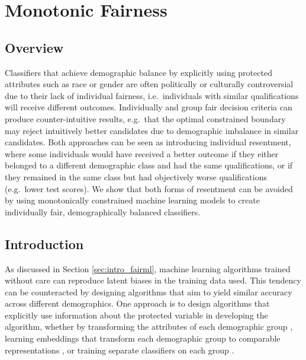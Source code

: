 \chapter{Monotonic Fairness}
\label{ch:MonoFair}

\section{Overview}

    Classifiers that achieve demographic balance by explicitly using protected attributes such as race or gender are often politically or culturally controversial due to their lack of individual fairness, i.e.\ individuals with similar qualifications will receive different outcomes. Individually and group fair decision criteria can produce counter-intuitive results, e.g.\ that the optimal constrained boundary may reject intuitively better candidates due to demographic imbalance in similar candidates. Both approaches can be seen as introducing individual resentment, where some individuals would have received a better outcome if they either belonged to a different demographic class and had the same qualifications, or if they remained in the same class but had objectively worse qualifications (e.g.\ lower test scores). We show that both forms of resentment can be avoided by using monotonically constrained machine learning models to create individually fair, demographically balanced classifiers.

\section{Introduction}
    \label{sec:monofair_intro}

    As discussed in Section \ref{sec:intro_fairml}, machine learning algorithms trained without care can reproduce latent biases in the training data used.  This tendency can be counteracted by designing algorithms that aim to yield similar accuracy across different demographics. One approach is to design algorithms that explicitly use information about the protected variable in developing the algorithm, whether by transforming the attributes of each demographic group \citep{dwork2012fairness}, learning embeddings that transform each demographic group to comparable representations \citep{MadCrePitZem2018,ZemQiSwePitDwo2013}, or training separate classifiers on each group \citep{DwoImmKalTauLei2018}.
    
